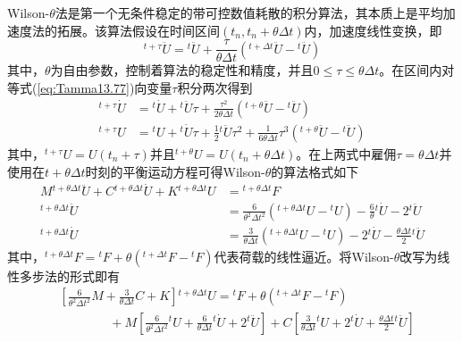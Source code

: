 Wilson-$\theta$法\cite{Wilson1968}是第一个无条件稳定的带可控数值耗散的积分算法，其本质上是平均加速度法的拓展。该算法假设在时间区间$(t_n,t_{n}+\theta\Delta t)$内，加速度线性变换，即
\begin{equation}
{^{t+\tau}\!\ddot{U}}={^t\!\ddot{U}}+\frac{\tau}{\theta\Delta t}({^{t+\Delta t}\!\ddot{U}}-{^t\!\ddot{U}})\label{eq:Tamma13.77}
\end{equation}
其中，$\theta$为自由参数，控制着算法的稳定性和精度，并且$0\le\tau\le\theta\Delta t$。在区间内对等式(\ref{eq:Tamma13.77})向变量$\tau$积分两次得到
\begin{subequations}
\begin{align}
{^{t+\tau}\!\dot{U}}&={^t\!\dot{U}}+{^t\!\ddot{U}}\tau+\frac{\tau^2}{2\theta\Delta t}({^{t+\theta}\!\ddot{U}}-{^t\!\ddot{U}})\\
{^{t+\tau}\!U}&={^t\!U}+{^t\!\dot{U}}\tau+\frac{1}{2}{^t\!\ddot{U}}\tau^2+\frac{1}{6\theta\Delta t}\tau^3({^{t+\theta}\!\ddot{U}}-{^t\!\ddot{U}})
\end{align}\label{eq:Tamma13.79}
\end{subequations}
其中，${^{t+\tau}\!U}=U(t_n+\tau)$并且${^{t+\theta}\!U}=U(t_n+\theta\Delta t)$。在上两式中雇佣$\tau=\theta\Delta t$并使用在$t+\theta\Delta t$时刻的平衡运动方程可得Wilson-$\theta$的算法格式如下
\begin{subequations}
\begin{align}
M{^{t+\theta\Delta t}\!\ddot{U}}+C{^{t+\theta\Delta t}\!\dot{U}}+K{^{t+\theta\Delta t}\!U}&={^{t+\theta\Delta t}\!F}\\
{^{t+\theta\Delta t}\!\ddot{U}}&=\frac{6}{\theta^2\Delta t^2}({^{t+\theta\Delta t}\!U}-{^t\!U})-\frac{6}{\theta}{^t\!\dot{U}}-2{^t\!\ddot{U}}\\
{^{t+\theta\Delta t}\!\dot{U}}&=\frac{3}{\theta\Delta t}({^{t+\theta\Delta t}\!U}-{^t\!U})-2{^t\!\dot{U}}-\frac{\theta\Delta t}{2}{^t\!\ddot{U}}
\end{align}\label{ee:Tammma13.80}
\end{subequations}
其中，${^{t+\theta\Delta t}\!F}={^t\!F}+\theta({^{t+\Delta t}\!F}-{^t\!F})$代表荷载的线性逼近。将Wilson-$\theta$改写为线性多步法的形式即有
\begin{equation}
\begin{aligned}
&\left[\frac{6}{\theta^2\Delta t^2}M+\frac{3}{\theta\Delta t}C+K\right]{^{t+\theta\Delta t}\!U}={^t\!F}+\theta({^{t+\Delta t}\!F}-{^t\!F})\\
&\qquad\qquad+M\left[\frac{6}{\theta^2\Delta t^2}{^t\!U}+\frac{6}{\theta\Delta t}{^t\!\dot{U}}+2{^t\!\ddot{U}}\right]+C\left[\frac{3}{\theta\Delta t}{^t\!U}+2{^t\!\dot{U}}+\frac{\theta\Delta t}{2}{^t\!\ddot{U}}\right]
\end{aligned}
\end{equation}
